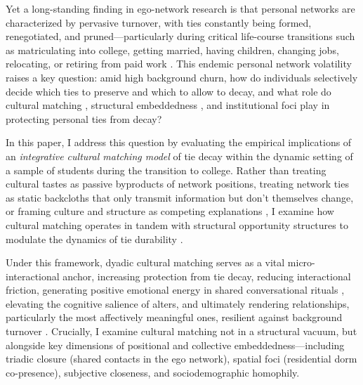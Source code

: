 \documentclass[12pt,letterpaper]{article}
\begin{document}
Yet a long-standing finding in ego-network research is that personal networks are characterized by pervasive turnover, with ties constantly being formed, renegotiated, and pruned---particularly during critical life-course transitions such as matriculating into college, getting married, having children, changing jobs, relocating, or retiring from paid work \citep{burt2000, wellman1997, kleinbaum2018reorganization-4a1, roy2022turnover, weiss2022life, kempnich2024how, vacchiano2024networked}. This endemic personal network volatility raises a key question: amid high background churn, how do individuals selectively decide which ties to preserve and which to allow to decay, and what role do cultural matching \citep{vaisey2010}, structural embeddedness \citep{burt2000}, and institutional foci \citep{feld2009homophily-595} play in protecting personal ties from decay?

In this paper, I address this question by evaluating the empirical implications of an \textit{integrative cultural matching model} of tie decay within the dynamic setting of a sample of students during the transition to college. Rather than treating cultural tastes as passive byproducts of network positions, treating network ties as static backcloths that only transmit information but don't themselves change, or framing culture and structure as competing explanations \citep{mark1998b}, I examine how cultural matching operates in tandem with structural opportunity structures to modulate the dynamics of tie durability \citep{burt2000, lewis2018, rivera2010dynamics-e3e}. 

Under this framework, dyadic cultural matching serves as a vital micro-interactional anchor, increasing protection from tie decay, reducing interactional friction, generating positive emotional energy in shared conversational rituals \citep{collins2004, lizardo2016why-418}, elevating the cognitive salience of alters, and ultimately rendering relationships, particularly the most affectively meaningful ones, resilient against background turnover \citep{dimaggio1987, lizardo2006, meuleman2021cultural-094, meuleman2023cultural-eab}. Crucially, I examine cultural matching not in a structural vacuum, but alongside key dimensions of positional and collective embeddedness---including triadic closure (shared contacts in the ego network), spatial foci (residential dorm co-presence), subjective closeness, and sociodemographic homophily.
\end{document}
